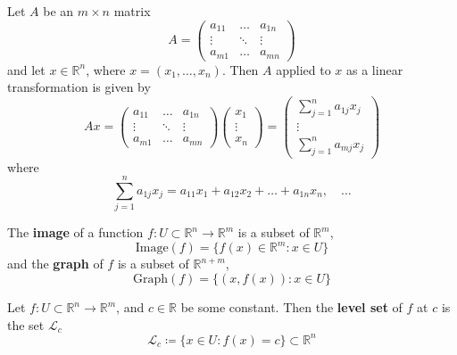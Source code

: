 \documentclass[openany]{book}
\newcommand{\R}{\mathbb{R}}
\begin{document}
\begin{defn}
    Let $A$ be an $m\times n$ matrix 
    \begin{equation*}
        A=\begin{pmatrix}
            a_{11}&\dots& a_{1n}\\
            \vdots&\ddots&\vdots\\
            a_{m1}&\dots&a_{mn}
        \end{pmatrix}
    \end{equation*}
    and let $x\in\R^n$, where $x=(x_1,\dots, x_n)$. Then $A$ applied to $x$ as a linear transformation is given by 
    \begin{equation*}
        Ax=\begin{pmatrix}
            a_{11}&\dots& a_{1n}\\
            \vdots&\ddots&\vdots\\
            a_{m1}&\dots&a_{mn}
        \end{pmatrix}\begin{pmatrix}
            x_1\\
            \vdots\\
            x_n
        \end{pmatrix}=\begin{pmatrix}
            \sum_{j=1}^na_{1j}x_j\\
            \vdots\\
            \sum_{j=1}^na_{mj}x_j
        \end{pmatrix}
    \end{equation*}
    where 
    \begin{equation*}
        \sum_{j=1}^na_{1j}x_j=a_{11}x_1+a_{12}x_2+\dots+a_{1n}x_n, \quad\dots
    \end{equation*}
\end{defn}


\begin{defn}
    The \textbf{image} of a function $f:U\subset \R^n\to\R^m$ is a subset of $\R^m$,
    \begin{equation*}
        \text{Image}(f)=\{f(x)\in\R^m: x\in U\}
    \end{equation*}
    and the \textbf{graph} of $f$ is a subset of $\R^{n+m}$,
    \begin{equation*}
        \text{Graph}(f)=\{(x,f(x)): x\in U\}
    \end{equation*}
\end{defn}


\begin{defn}
    Let $f:U\subset\R^n\to\R^m$, and $c\in\R$ be some constant. Then the \textbf{level set} of $f$ at $c$ is the set $\mathcal{L}_c$
    \begin{equation*}
        \mathcal{L}_c\coloneq\{x\in U: f(x)=c\}\subset\R^n
    \end{equation*}
\end{defn}
\end{document}
